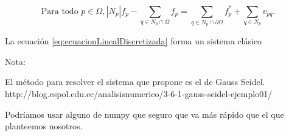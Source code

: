 \documentclass[11pt,a4paper]{article}
\begin{document}
\begin{equation}\label{eq:ecuacionLinealDiscretizada}
    \text{Para todo } p \in \Omega, |N_p| f_p - \sum_{q \in N_p \cap \Omega} f_p = \sum_{q \in N_p \cap \partial \Omega} f^*_p + \sum_{q \in N_p } v_{pq}.
\end{equation}

La ecuación  \ref{eq:ecuacionLinealDiscretizada} forma un sistema clásico 



Nota: 

El método para resolver el sistema que propone es el de Gauss Seidel. 
http://blog.espol.edu.ec/analisisnumerico/3-6-1-gauss-seidel-ejemplo01/

Podríamos usar alguno de numpy que seguro que va más rápido que el que planteemos nosotros. 
\end{document}

